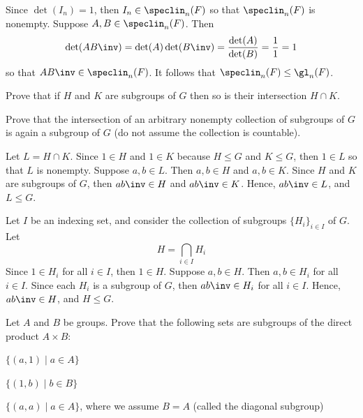 \begin{sol}
    Since $\det(I_n) = 1$, then $I_n \in \speclin_n(F)$ so that $\speclin_n(F)$ is nonempty. Suppose $A, B \in \speclin_n(F)$. Then
    \[\det(AB\inv) = \det(A)\det(B\inv) = \frac{\det(A)}{\det(B)} = \frac 11 = 1\]
    so that $AB\inv \in \speclin_n(F)$. It follows that $\speclin_n(F) \leq \gl_n(F)$.
\end{sol}

\begin{exercise} \label{ex2.1.10}
    \begin{subproblems}
        \item Prove that if $H$ and $K$ are subgroups of $G$ then so is their intersection $H \cap K$.
        \item Prove that the intersection of an arbitrary nonempty collection of subgroups of $G$ is again a subgroup of $G$ (do not assume the collection is countable).
    \end{subproblems}
\end{exercise}

\begin{solalph}
    \item Let $L = H \cap K$. Since $1 \in H$ and $1 \in K$ because $H \leq G$ and $K \leq G$, then $1 \in L$ so that $L$ is nonempty. Suppose $a, b \in L$. Then $a, b \in H$ and $a, b \in K$. Since $H$ and $K$ are subgroups of $G$, then $ab\inv \in H$ and $ab\inv \in K$. Hence, $ab\inv \in L$, and $L \leq G$.
    \item Let $I$ be an indexing set, and consider the collection of subgroups $\{ H_i \}_{i \in I}$ of $G$. Let
    \[H = \bigcap_{i \in I} H_i\]
    Since $1 \in H_i$ for all $i \in I$, then $1 \in H$. Suppose $a, b \in H$. Then $a, b \in H_i$ for all $i \in I$. Since each $H_i$ is a subgroup of $G$, then $ab\inv \in H_i$ for all $i \in I$. Hence, $ab\inv \in H$, and $H \leq G$.
\end{solalph}

\begin{exercise} \label{ex2.1.11}
    Let $A$ and $B$ be groups. Prove that the following sets are subgroups of the direct product $A \times B$:
    \begin{subproblems}
        \item $\{ (a, 1) \mid a \in A \}$
        \item $\{ (1, b) \mid b \in B \}$
        \item $\{ (a, a) \mid a \in A \}$, where we assume $B = A$ (called the diagonal subgroup)
    \end{subproblems}
\end{exercise}

